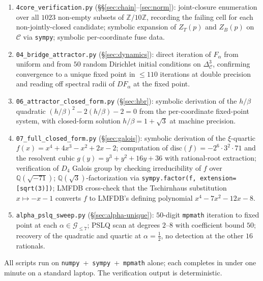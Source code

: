 \documentclass[11pt,reqno]{amsart}
\theoremstyle{plain}
\theoremstyle{definition}
\theoremstyle{remark}
\newcommand{\Z}{\mathbb{Z}}
\newcommand{\Q}{\mathbb{Q}}
\newcommand{\Zten}{\Z/10\Z}
\newcommand{\Cfour}{\mathcal{C}}
\begin{document}
\begin{enumerate}\setlength\itemsep{0pt}
\item \texttt{4core\_verification.py} (\S\S\ref{sec:chain}--\ref{sec:norm}):
joint-closure enumeration over all $1023$ non-empty subsets of
$\Zten$, recording the failing cell for each non-jointly-closed
candidate; symbolic expansion of $Z_{T}(p)$ and $Z_{B}(p)$ on
$\Cfour$ via \texttt{sympy}; symbolic per-coordinate fuse data.

\item \texttt{04\_bridge\_attractor.py} (\S\ref{sec:dynamics}):
direct iteration of $F_{\alpha}$ from uniform and from $50$
random Dirichlet initial conditions on $\Delta^{3}_{\Cfour}$,
confirming convergence to a unique fixed point in
$\le 110$ iterations at double precision and reading off
spectral radii of $DF_{\alpha}$ at the fixed point.

\item \texttt{06\_attractor\_closed\_form.py} (\S\ref{sec:hbr}):
symbolic derivation of the $h/\beta$ quadratic
$(h/\beta)^{2} - 2(h/\beta) - 2 = 0$ from the per-coordinate
fixed-point system, with closed-form solution
$h/\beta = 1 + \sqrt{3}$ at machine precision.

\item \texttt{07\_full\_closed\_form.py} (\S\ref{sec:galois}):
symbolic derivation of the $\xi$-quartic
$f(x) = x^{4} + 4x^{3} - x^{2} + 2x - 2$; computation of
$\mathrm{disc}(f) = -2^{6}\cdot 3^{2}\cdot 71$ and the resolvent
cubic $g(y) = y^{3} + y^{2} + 16y + 36$ with rational-root
extraction; verification of $D_{4}$ Galois group by checking
irreducibility of $f$ over $\Q(\sqrt{-71})$;
$\Q(\sqrt{3})$-factorization via
\texttt{sympy.factor(f, extension=[sqrt(3)])}; LMFDB cross-check
that the Tschirnhaus substitution $x \mapsto -x - 1$ converts $f$
to LMFDB's defining polynomial $x^{4} - 7x^{2} - 12x - 8$.

\item \texttt{alpha\_pslq\_sweep.py} (\S\ref{sec:alpha-unique}):
$50$-digit \texttt{mpmath} iteration to fixed point at each
$\alpha\in\mathcal{G}_{\le 7}$; PSLQ scan at degrees $2$--$8$
with coefficient bound $50$; recovery of the quadratic and
quartic at $\alpha = \tfrac12$, no detection at the other $16$
rationals.
\end{enumerate}

All scripts run on \texttt{numpy}~+~\texttt{sympy}~+~\texttt{mpmath} alone;
each completes in under one minute on a standard laptop. The
verification output is deterministic.
\end{document}
